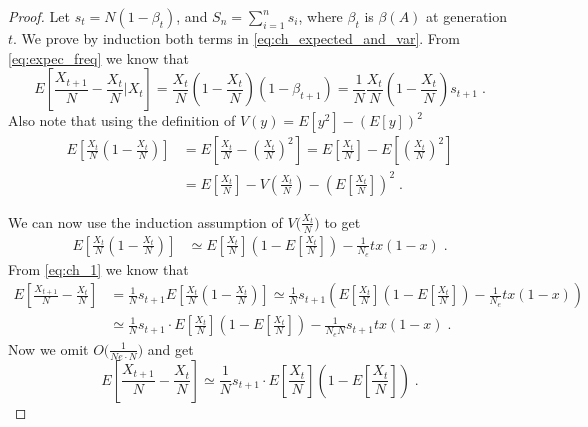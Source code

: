 \documentclass[12pt]{extarticle}
\begin{document}
\begin{appendices}
\begin{proof}
Let $s_t=N(1-\beta_t)$, and $S_n=\sum\limits_{i=1}^n s_i$, where $\beta_t$ is $\beta(A)$ at generation $t$.
We prove by induction both terms in \cref{eq:ch_expected_and_var}.
From \cref{eq:expec_freq} we know that
\begin{equation}\label{eq:ch_1}
E\left[\frac{X_{t+1}}{N}-\frac{X_t}{N}\bigg|X_t\right] 
= \frac{X_t}{N}\left(1-\frac{X_t}{N}\right)(1-\beta_{t+1}) 
= \frac{1}{N}\frac{X_t}{N}\left(1-\frac{X_t}{N}\right)s_{t+1} \;.
\end{equation}
Also note that using the definition of $V(y)=E[y^2]-(E[y])^2$
\begin{equation}
\begin{split}
E\left[\frac{X_t}{N}\left(1-\frac{X_t}{N}\right)\right] 
&= E\left[\frac{X_t}{N}-\left(\frac{X_t}{N}\right)^2\right] 
= E\left[\frac{X_t}{N}\right] - E\left[\left(\frac{X_t}{N}\right)^2\right] \\
&= E\left[\frac{X_t}{N}\right] - V\left(\frac{X_t}{N}\right) - \left(E\left[\frac{X_t}{N}\right]\right)^2 \;.
\end{split}
\end{equation}

We can now use the induction assumption of $V\big(\frac{X_t}{N}\big)$ to get
\begin{equation}
\begin{split}
E\left[\frac{X_t}{N}\left(1-\frac{X_t}{N}\right)\right] 
&\simeq E\left[\frac{X_t}{N}\right]\left(1-E\left[\frac{X_t}{N}\right]\right)-\frac{1}{N_e}tx(1-x) \;.
\end{split}
\end{equation}
From \cref{eq:ch_1} we know that
\begin{equation}
\begin{split}
E\left[\frac{X_{t+1}}{N}-\frac{X_t}{N}\right] 
&= \frac{1}{N}s_{t+1}E\left[\frac{X_t}{N}\left(1-\frac{X_t}{N}\right)\right] 
\simeq \frac{1}{N}s_{t+1}\left(E\left[\frac{X_t}{N}\right]\left(1-E\left[\frac{X_t}{N}\right]\right) - \frac{1}{N_e}tx(1-x)\right) \\
&\simeq \frac{1}{N}s_{t+1}\cdot E\left[\frac{X_t}{N}\right]\left(1-E\left[\frac{X_t}{N}\right]\right) - \frac{1}{N_e N}s_{t+1}tx(1-x) \;.
\end{split}
\end{equation}
Now we omit $O\big(\frac{1}{Ne\cdot N}\big)$ and get
\begin{equation}\label{eq:ch_2}
E\left[\frac{X_{t+1}}{N}-\frac{X_t}{N}\right] \simeq \frac{1}{N}s_{t+1}\cdot E\left[\frac{X_t}{N}\right]\left(1-E\left[\frac{X_t}{N}\right]\right) \;.
\end{equation}


\end{proof}
\end{appendices}
\end{document}
